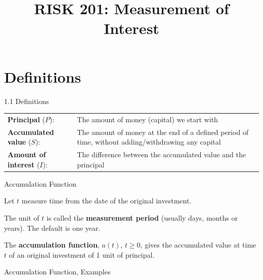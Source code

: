 \documentclass{beamer}
\title{RISK 201: Measurement of Interest}
\begin{document}
\maketitle

\section{Definitions}

\begin{frame}{1.1 Definitions}

\renewcommand{\arraystretch}{1.4}
\begin{tabular}{p{}p{}}
\toprule
\textbf{Principal} ($P$): & The amount of money (capital) we start with \\
\textbf{Accumulated value} ($S$): & The amount of money at the end of a defined period of time, without adding/withdrawing any capital \\
\textbf{Amount of interest} ($I$): & The difference between the accumulated value and the principal \\
\bottomrule
\end{tabular}

\end{frame}

\begin{frame}{Accumulation Function}

Let $t$ measure time from the date of the original investment.

\bigskip
The unit of $t$ is called the \textbf{measurement period} (usually days, months or years). The default is one year.

\bigskip
\begin{defn}
The \textbf{accumulation function}, $a(t)$, $t \ge 0$, gives the accumulated value at time $t$ of an original investment of 1 unit of principal.
\end{defn}

\end{frame}

\begin{frame}{Accumulation Function, Examples}

\begin{center}
\end{center}

\end{frame}
\end{document}
